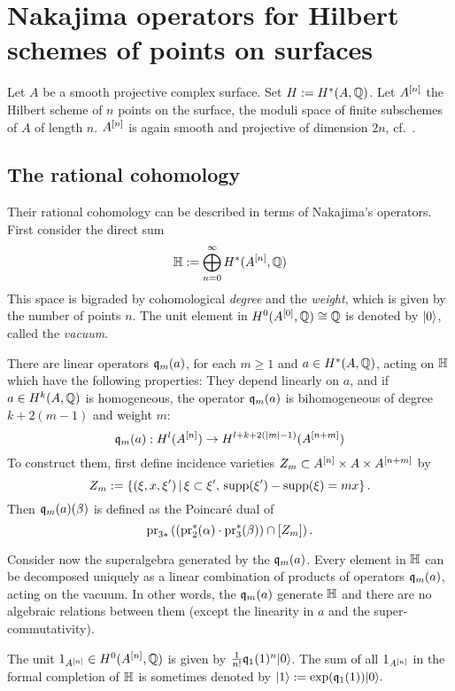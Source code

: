 \section{Nakajima operators for Hilbert schemes of points on surfaces}

Let $A$ be a smooth projective complex surface. Set $H:=H^*(A,\mathbb{Q})$. Let $A^{[n]}$ the Hilbert scheme of $n$ points on the surface, \ie the moduli space of finite subschemes of $A$ of length $n$.
$A^{[n]}$ is again smooth and projective of dimension $2n$, cf.~\cite{Fogarty}. 
\subsection{The rational cohomology}
Their rational cohomology can be described in terms of Nakajima's \cite{Nakajima} operators. First consider the direct sum
$$
\mathbb{H} := \bigoplus_{n=0}^{\infty} H^*(A^{[n]},\mathbb{Q})
$$
This space is bigraded by cohomological \emph{degree} and the \emph{weight}, which is given by the number of points $n$. The unit element in $H^0(A^{[0]},\mathbb{Q}) \cong \mathbb{Q}$ is denoted by $|0\rangle$, called the \emph{vacuum}.
\begin{definition}
There are linear operators $\mathfrak{q}_m(a)$, for each $m\geq 1$ and $a \in H^*(A,\mathbb{Q})$, acting on $\mathbb{H}$ which have the following properties: They depend linearly on $a$, and if $a\in H^k(A,\mathbb{Q})$ is homogeneous, the operator $\mathfrak{q}_{m}(a)$ is bihomogeneous of degree $k+2(m-1)$ and weight $m$:
$$
\mathfrak{q}_{m}(a) : H^l(A^{[n]}) \rightarrow H^{l+k+2(|m|-1)}(A^{[n+m]})
$$
To construct them, first define incidence varieties $Z_m\subset A^{[n]}\times A\times A^{[n+m]}$ by
$$
Z_m := \left\{(\xi,x,\xi')\, |\, \xi\subset\xi',\, \operatorname{supp}(\xi') -\operatorname{supp}(\xi) = mx \right\}.
$$
Then $\mathfrak{q}_m(a)(\beta) $ is defined as the Poincar\'e dual of 
$$
\operatorname{pr}_{3*}\left( \left(\operatorname{pr}_2^*(\alpha)\cdot \operatorname{pr}_3^*(\beta)\right) \cap [Z_m] \right).
$$
\end{definition}
Consider now the superalgebra generated by the $\mathfrak{q}_m(a)$. 
Every element in $\mathbb{H}$ can be decomposed uniquely as a linear combination of products of operators $\mathfrak{q}_{m}(a)$, acting on the vacuum. 
In other words, the $\mathfrak{q}_m(a)$ generate $\mathbb{H}$ and there are no algebraic relations between them (except the linearity in $a$ and the super-commutativity).
\begin{example}
The unit $1_{A^{[n]}} \in H^0({A^{[n]}},\mathbb{Q})$ is given by $\frac{1}{n!}\mathfrak{q}_1(1)^n|0\rangle$. The sum of all $1_{A^{[n]}}$ in the formal completion of $\mathbb{H}$ is sometimes denoted by
$
\left|1\right> := \exp(\mathfrak{q}_1(1))|0\rangle.
$
\end{example}

